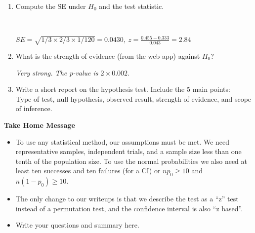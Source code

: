 \begin{enumerate}
\begin{key} 
{\it $H_0: p = 1/3$, versus $H_a:  p \neq 1/3$}
\end{key}
 
\item Compute the SE under $H_0$ and the test statistic.
\begin{students}
    \vspace{1cm}    \\
\end{students}

\begin{key} 
{\it $SE = \sqrt{1/3 \times 2/3 \times 1/120} =0.0430$, $z = \frac{0.455 - 0.333}{0.043} = 2.84$}
\end{key}


\item What is the strength of evidence (from the web app) against   $H_0$?  
\begin{students}
       \newpage
\end{students}

\begin{key} 
{\it Very strong.  The p-value is $2 \times 0.002$. }
\end{key}

\item Write a short report on the hypothesis test. Include the 5 main
  points:\\
  Type of test, null hypothesis, observed result, strength of
  evidence, and scope of inference. \vfill

\end{enumerate}



\begin{center}
  {\large\bf Take Home Message}
\end{center}
 
\begin{itemize}
\item To use any statistical method, our assumptions must be met. We
  need representative samples, independent trials, and a sample size
  less than one tenth of the population size.  To use the normal
  probabilities we also need at least ten successes and ten failures
  (for a CI) or $np_0 \geq 10$ and $n(1-p_0) \geq 10$.  
\item The only change to our writeups is that we describe the test as
  a ``z'' test instead of a permutation test, and the confidence
  interval is also ``z based''.
\item Write your questions and summary here.

\end{itemize}\vspace*{1in}



